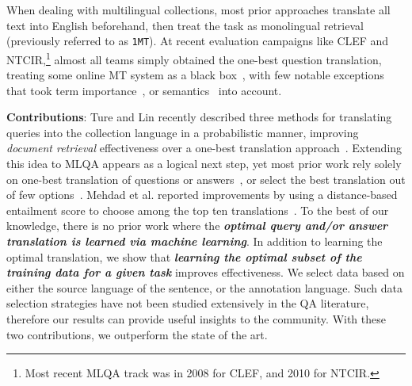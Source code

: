 \documentclass{sig-alternate-05-2015}
\begin{document}
When dealing with multilingual collections, most prior approaches translate all text into English beforehand, then
treat the task as monolingual retrieval (previously referred to as {\tt 1MT}). At recent 
evaluation campaigns like CLEF and NTCIR,\footnote{Most recent MLQA track was in 2008 for CLEF, and 2010 for 
NTCIR.} almost all teams simply obtained the one-best question translation, treating some online MT system as a black 
box~\cite{Adafre:2009aa,Hartrumpf:2009aa,Martinez-Gonzalez:2009aa,Lin:aa,Shima:2010aa}, with few notable 
exceptions that took term importance~\cite{Ren:aa}, or semantics~\cite{Munoz-Terol:2009aa} into account.

\textbf{Contributions}: Ture and Lin recently described three methods for translating queries into the collection language 
in a probabilistic manner, improving \emph{document retrieval} effectiveness over a one-best translation 
approach~\cite{Ture:2014aa}.
Extending this idea to MLQA appears as a logical next step, yet most prior work
rely solely on one-best translation of questions or answers~\cite{Ko:2010ab,Garcia-Cumbreras:2012aa,Chaturvedi:2014aa},
or select the best translation out of few options~\cite{Sacaleanu:2008aa,Mitamura:2006aa}.
Mehdad et al. reported improvements by using a distance-based entailment score to choose among the top ten 
translations~\cite{Mehdad:2010aa}. 
To the best of 
our knowledge, there is no prior work where the \emph{\textbf{optimal query and/or answer translation is 
learned via machine learning}}.
In addition to learning the optimal translation, we show that \emph{\textbf{learning the optimal subset of the training data 
for a given task}} improves effectiveness. We select data based on either the source 
language of the sentence, or the annotation language. Such data selection strategies 
have not been studied extensively in the QA literature, therefore our results can provide useful insights to the community.
With these two contributions, we outperform the state of the art.

\end{document}
